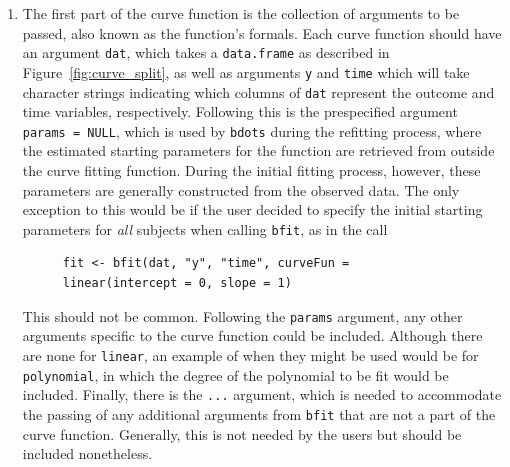\documentclass{article}
\newcommand{\xt}{\texttt}%
\begin{document}
\begin{enumerate}
\item The first part of the curve function is the collection of arguments to be passed, also known as the function's formals. Each curve function should have an argument \xt{dat}, which takes a \xt{data.frame} as described in Figure~\ref{fig:curve_split}, as well as arguments \xt{y} and \xt{time} which will take character strings indicating which columns of \xt{dat} represent the outcome and time variables, respectively. Following this is the prespecified argument \xt{params = NULL}, which is used by \xt{bdots} during the refitting process, where the estimated starting parameters for the function are retrieved from outside the curve fitting function. During the initial fitting process, however, these parameters are generally constructed from the observed data. The only exception to this would be if the user decided to specify the initial starting parameters for \emph{all} subjects when calling \xt{bfit}, as in the call

\begin{singlespace}
\begin{figure}[H]
\centering
\begin{BVerbatim}
fit <- bfit(dat, "y", "time", curveFun = linear(intercept = 0, slope = 1)
\end{BVerbatim}
\end{figure}
\end{singlespace}
This should not be common. Following the \xt{params} argument, any other arguments specific to the curve function could be included. Although there are none for \xt{linear}, an example of when they might be used would be for \xt{polynomial}, in which the degree of the polynomial to be fit would be included. Finally, there is the \xt{...} argument, which is needed to accommodate the passing of any additional arguments from \xt{bfit} that are not a part of the curve function. Generally, this is not needed by the users but should be included nonetheless. 


\end{enumerate}
\end{document}
